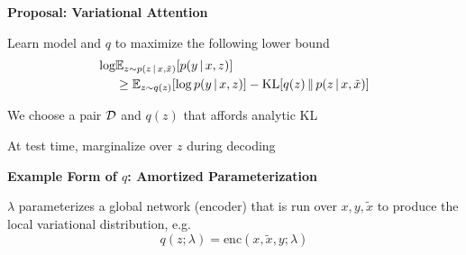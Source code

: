 \documentclass[aspectratio=169]{beamer}
\let\tempone\itemize
\let\temptwo\enditemize
\renewenvironment{itemize}{\tempone\addtolength{\itemsep}{0.5\baselineskip}}{\temptwo}
\newcommand{\thetitle}[1]{{\begin{center}\textbf{{#1}}\end{center}}}
\begin{document}
\begin{frame}\thetitle{Proposal: Variational Attention}
\begin{itemize}
    \item Learn model and $q$ to maximize the following lower bound
        \begin{align*}
        \log &\mathbb{E}_{z \sim p(z \,|\, x, \tilde{x})}[p(y \,|\, x, z)]\\
        &\ge\mathbb{E}_{z \sim q(z)}[\log p(y \,|\, x, z)] - \operatorname*{KL}[q(z) \, \Vert \, p(z
  \,|\, x, \tilde{x})]
        \end{align*}
    \item We choose a pair $\mathcal{D}$ and $q(z)$ that affords analytic KL
    \item At test time, marginalize over $z$ during decoding
\end{itemize}
\end{frame}


\begin{frame}
\thetitle{Example Form of $q$: Amortized Parameterization}
\begin{center}
\end{center}
$\lambda$ parameterizes a global network (encoder) that is run over $x, y, \tilde{x}$
    to produce the local variational distribution, e.g.
    \[ q(z ; \lambda) = \text{enc}(x, \tilde{x}, y ; \lambda)\]
\end{frame}
\end{document}
